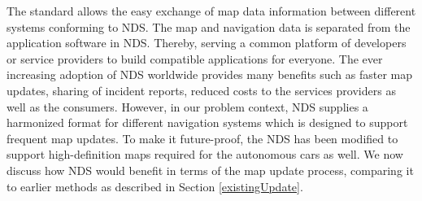 The standard allows the easy exchange of map data information between different systems conforming to NDS. The map and navigation data is separated from the application software in NDS. Thereby, serving a common platform of developers or service providers to build compatible applications for everyone. The ever increasing adoption of NDS worldwide provides many benefits such as faster map updates, sharing of incident reports, reduced costs to the services providers as well as the consumers. However, in our problem context, NDS supplies a harmonized format for different navigation systems which is designed to support frequent map updates. To make it future-proof, the NDS has been modified to support high-definition maps required for the autonomous cars as well. We now discuss how NDS would benefit in terms of the map update process, comparing it to earlier methods as described in Section \ref{existingUpdate}. 

